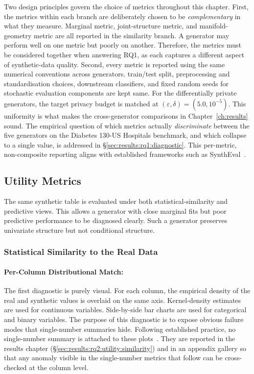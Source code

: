 Two design principles govern the choice of metrics throughout this
chapter. First, the metrics within each branch are deliberately
chosen to be \emph{complementary} in what they measure. Marginal
metric, joint-structure metric, and manifold-geometry metric are
all reported in the similarity branch. A generator may perform 
well on one metric but poorly on another. Therefore,
the metrics must be considered together when answering RQ1, as each captures
a different aspect of synthetic-data quality. Second,
every metric is reported using the same numerical conventions across
generators. train/test split, preprocessing and
standardisation choices, downstream
classifiers, and fixed random seeds for stochastic evaluation
components are kept same. For the differentially private generators, the target
privacy budget is matched at $(\varepsilon,\delta)=(5.0,10^{-5})$.
This uniformity is what makes the cross-generator comparisons in
Chapter~\ref{ch:results} sound. The
empirical question of which metrics actually \emph{discriminate}
between the five generators on the Diabetes 130-US Hospitals benchmark,
and which collapse to a single value, is addressed in
\S\ref{sec:results:rq1:diagnostic}. This per-metric, non-composite
reporting aligns with established frameworks such as
SynthEval~\cite{lautrup2025syntheval}.

\subsection{Utility Metrics}
\label{sec:eval:utility}

The same synthetic table is evaluated under both statistical-similarity 
and predictive views. This allows a generator with close marginal 
fits but poor predictive performance to be diagnosed clearly. 
Such a generator preserves univariate structure but not conditional structure.

\subsubsection{Statistical Similarity to the Real Data}
\label{sec:eval:utility:similarity}

\paragraph{Per-Column Distributional Match:}
\label{sec:eval:utility:similarity:dist}
The first diagnostic is purely visual. For each column, the empirical 
density of the real and synthetic values is overlaid on the same axis. 
Kernel-density estimates are used for continuous variables. Side-by-side 
bar charts are used for categorical and binary variables. The
purpose of this diagnostic is to expose obvious failure modes that
single-number summaries hide. Following established practice, no
single-number summary is attached to these plots~\cite{hernandez2022synthetic,Murtaza2023}.
They are reported in
the results chapter (\S\ref{sec:results:rq2:utility:similarity}) and
in an appendix gallery so that any anomaly visible in the
single-number metrics that follow can be cross-checked at the
column level.

